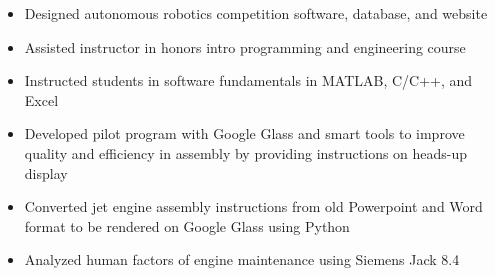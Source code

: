 \documentclass[11pt,letterpaper,ragged2e,withhyper]{altacv}
\newif\ifbubbles
\begin{document}
\begin{paracol}{2}
\ifbubbles
    \cvtag{TypeScript}
    \cvtag{Java}
    \cvtag{React}
    \cvtag{Redux}
    \cvtag{Jest}
    \cvtag{Enzyme}
    \cvtag{REST}
    \cvtag{i18next}
\fi

\divider

\begin{itemize}
    \item Designed autonomous robotics competition software, database, and website
    \item Assisted instructor in honors intro programming and engineering course
    \item Instructed students in software fundamentals in MATLAB, C/C++, and Excel
\end{itemize}

\ifbubbles
    \cvtag{Education}
    \cvtag{C}
    \cvtag{C++}
    \cvtag{MATLAB}
    \cvtag{Excel}
    \cvtag{C\#}
    \cvtag{ASP.NET}
    \cvtag{SQL}
\fi

\divider

\begin{itemize}
    \item Developed pilot program with Google Glass and smart tools to improve quality and efficiency in assembly by providing instructions on heads-up display
    \item Converted jet engine assembly instructions from old Powerpoint and Word format to be rendered on Google Glass using Python
    \item Analyzed human factors of engine maintenance using Siemens Jack 8.4
\end{itemize}

\ifbubbles
    \cvtag{Python}
    \cvtag{Google Glass}
    \cvtag{AR}
    \cvtag{Project Management}
\fi




\end{paracol}
\end{document}
